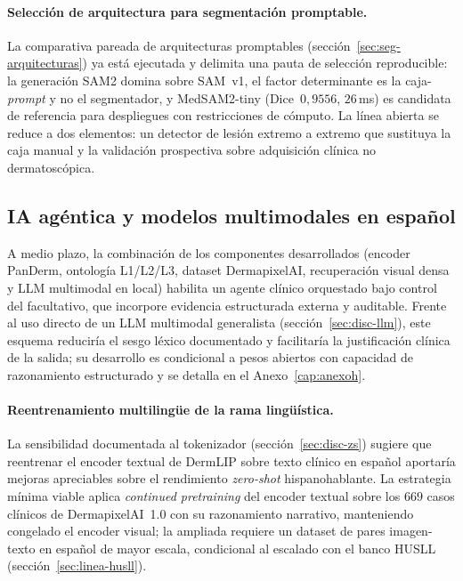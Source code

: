 \paragraph{Selección de arquitectura para segmentación promptable.}
\label{sec:linea-seg-arquitectura}
La comparativa pareada de arquitecturas promptables
(sección~\ref{sec:seg-arquitecturas}) ya está ejecutada y delimita una
pauta de selección reproducible: la generación SAM2 domina sobre SAM~v1,
el factor determinante es la caja-\emph{prompt} y no el segmentador, y
MedSAM2-tiny (Dice~$0{,}9556$, $26$\,ms) es candidata de referencia para
despliegues con restricciones de cómputo. La línea abierta se reduce a dos
elementos: un detector de lesión extremo a extremo que sustituya la caja
manual y la validación prospectiva sobre adquisición clínica no
dermatoscópica.

\subsection{IA agéntica y modelos multimodales en español}
\label{sec:linea-agentica}

A medio plazo, la combinación de los componentes desarrollados (encoder
PanDerm, ontología L1/L2/L3, dataset DermapixelAI, recuperación visual
densa y LLM multimodal en local) habilita un agente clínico orquestado
bajo control del facultativo, que incorpore evidencia estructurada externa
y auditable. Frente al uso directo de un LLM multimodal generalista
(sección~\ref{sec:disc-llm}), este esquema reduciría el sesgo léxico
documentado y facilitaría la justificación clínica de la salida; su
desarrollo es condicional a pesos abiertos con capacidad de razonamiento
estructurado y se detalla en el Anexo~\ref{cap:anexoh}.

\paragraph{Reentrenamiento multilingüe de la rama lingüística.}
\label{sec:linea-multilingual}
La sensibilidad documentada al tokenizador (sección~\ref{sec:disc-zs})
sugiere que reentrenar el encoder textual de DermLIP sobre texto clínico
en español aportaría mejoras apreciables sobre el rendimiento
\emph{zero-shot} hispanohablante. La estrategia mínima viable aplica
\emph{continued pretraining} del encoder textual sobre los $669$ casos
clínicos de DermapixelAI~1.0 con su razonamiento narrativo, manteniendo
congelado el encoder visual; la ampliada requiere un dataset de pares
imagen-texto en español de mayor escala, condicional al escalado con el
banco HUSLL (sección~\ref{sec:linea-husll}).

